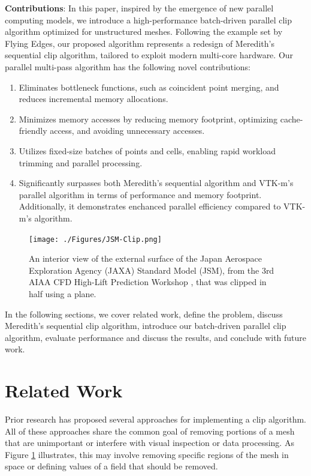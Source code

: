 \documentclass{egpubl}
\begin{document}
\textbf{Contributions}:
In this paper, inspired by the emergence of new parallel computing models, we introduce a high-performance batch-driven parallel clip algorithm optimized for unstructured meshes. Following the example set by Flying Edges, our proposed algorithm represents a redesign of Meredith's sequential clip algorithm, tailored to exploit modern multi-core hardware.
Our parallel multi-pass algorithm has the following novel contributions:
\begin{enumerate}
    \item Eliminates bottleneck functions, such as coincident point merging, and reduces incremental memory allocations.
    \item Minimizes memory accesses by reducing memory footprint, optimizing cache-friendly access, and avoiding unnecessary accesses.
    \item Utilizes fixed-size batches of points and cells, enabling rapid workload trimming and parallel processing.
    \item Significantly surpasses both Meredith's sequential algorithm and VTK-m's \cite{VTKm} parallel algorithm in terms of performance and memory footprint. Additionally, it demonstrates enchanced parallel efficiency compared to VTK-m's algorithm.
\end{enumerate}

\begin{figure}[h]
  \centering
  \texttt{[image: ./Figures/JSM-Clip.png]}
  \caption{An interior view of the external surface of the Japan Aerospace Exploration Agency (JAXA) Standard Model (JSM), from the 3rd AIAA CFD High-Lift Prediction Workshop \cite{JAXAModel}, that was clipped in half using a plane.}
  \label{fig:jaxa-model}
\end{figure}

In the following sections, we cover related work, define the problem, discuss Meredith's sequential clip algorithm, introduce our batch-driven parallel clip algorithm, evaluate performance and discuss the results, and conclude with future work.

\section{Related Work}
\label{sec:related-work}

Prior research has proposed several approaches for implementing a clip algorithm. All of these approaches share the common goal of removing portions of a mesh that are unimportant or interfere with visual inspection or data processing. As Figure \ref{fig:jaxa-model} illustrates, this may involve removing specific regions of the mesh in space or defining values of a field that should be removed.
\end{document}

